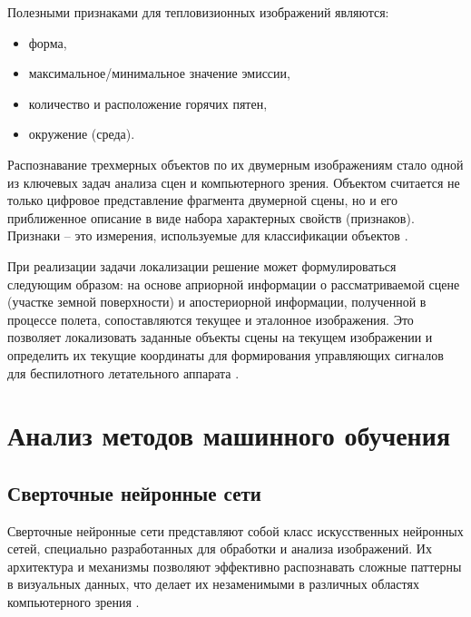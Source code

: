 Полезными признаками для тепловизионных изображений являются:
\begin{itemize}
    \item форма,
    \item  максимальное/минимальное значение эмиссии,
    \item  количество и расположение горячих пятен,
    \item окружение (среда). 
\end{itemize}

Распознавание трехмерных объектов по их двумерным изображениям стало одной из ключевых задач анализа сцен и компьютерного зрения. Объектом считается не только цифровое представление фрагмента двумерной сцены, но и его приближенное описание в виде набора характерных свойств (признаков). Признаки – это измерения, используемые для классификации объектов \cite{rasposnavanie}.

При реализации задачи локализации решение может формулироваться следующим образом: на основе априорной информации о рассматриваемой сцене (участке земной поверхности) и апостериорной информации, полученной в процессе полета, сопоставляются текущее и эталонное изображения. Это позволяет локализовать заданные объекты сцены на текущем изображении и определить их текущие координаты для формирования управляющих сигналов для беспилотного летательного аппарата \cite{insarov}.

\section{Анализ методов машинного обучения}
\subsection{Сверточные нейронные сети}
Сверточные нейронные сети представляют собой класс искусственных нейронных сетей, специально разработанных для обработки и анализа изображений. Их архитектура и механизмы позволяют эффективно распознавать сложные паттерны в визуальных данных, что делает их незаменимыми в различных областях компьютерного зрения \cite{Krizhevsky2012ImageNetCW}.

